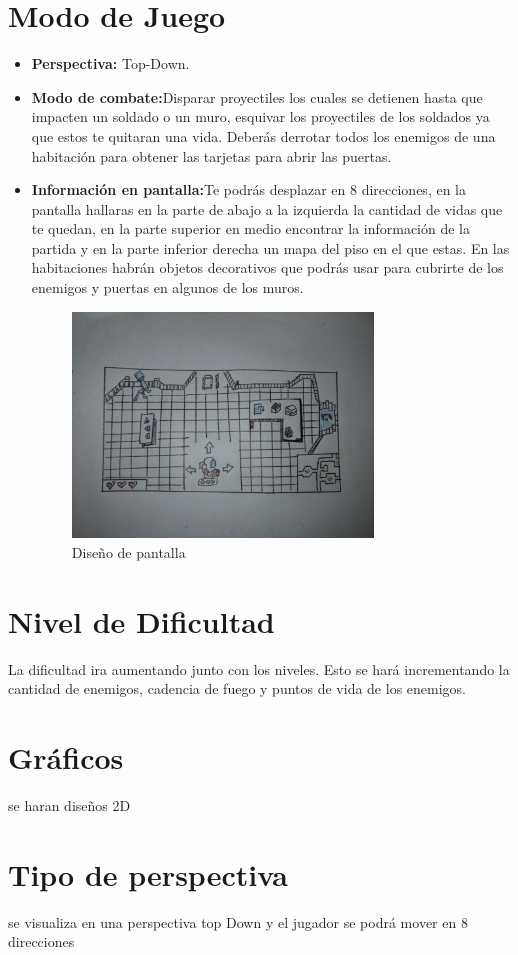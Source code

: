 \documentclass{article}
\begin{document}
\section{Modo de Juego}\label{modo}
\begin{itemize}
    \item \textbf{Perspectiva:} Top-Down.
    \item \textbf{Modo de combate:}Disparar proyectiles los cuales se detienen hasta que impacten un soldado o un muro, esquivar los proyectiles de los soldados ya que estos te quitaran una vida. Deberás derrotar todos los enemigos de una habitación para obtener las tarjetas para abrir las puertas.
    \item \textbf{Información en pantalla:}Te podrás desplazar en 8 direcciones, en la pantalla hallaras en la parte de abajo a la izquierda la cantidad de vidas que te quedan, en la parte superior en medio encontrar la información de la partida y en la parte inferior derecha un mapa del piso en el que estas. En las habitaciones habrán objetos decorativos que podrás usar para cubrirte de los enemigos y puertas en algunos de los muros. 

\begin{figure}[h]
\includegraphics[width=8cm]{02.jpg}
\centering
\caption{Diseño de pantalla}
\label{fig:cpplogo}
\end{figure}

\end{itemize}

\section{Nivel de Dificultad}\label{dificultad}
La dificultad ira aumentando junto con los niveles. Esto se hará incrementando la cantidad de enemigos, cadencia de fuego y puntos de vida de los enemigos.

\section{Gráficos}\label{gráficos}
se haran diseños 2D 
\section{Tipo de perspectiva}\label{gráficos}
se visualiza en una perspectiva top Down y el jugador se podrá mover en 8 direcciones



\end{document}
